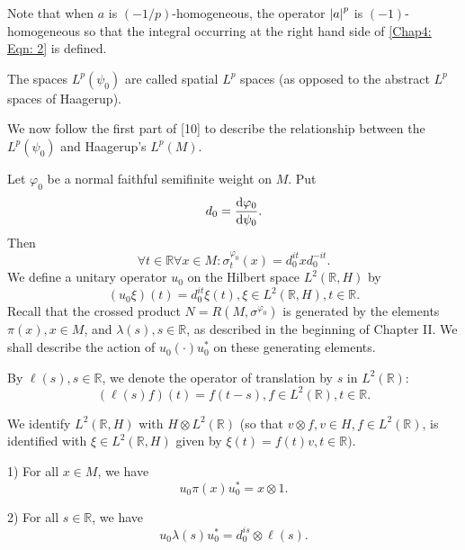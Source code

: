 Note that when $a$ is $(-1/p)$-homogeneous, the operator $\abs{a}^p$ is $(-1)$-homogeneous so that the integral occurring at the right hand side of \eqref{Chap4: Eqn: 2} is defined.\par
The spaces $L^p(\psi_0)$ are called spatial $L^p$ spaces (as opposed to the abstract $L^p$ spaces of Haagerup).\par
We now follow the first part of [10] to describe the relationship between the $L^p(\psi_0)$ and Haagerup's $L^p(M)$.\par
Let $\varphi_0$ be a normal faithful semifinite weight on $M$. Put
\begin{equation}
    d_0=\dv{\varphi_0}{\psi_0}.
\end{equation}
Then
\begin{equation}
    \forall t\in \mathbb{R}\forall x\in M:\sigma_t^{\varphi_0}(x)=d_0^{it}xd_0^{-it}.
\end{equation}
We define a unitary operator $u_0$ on the Hilbert space $L^2(\mathbb{R},H)$ by
\begin{equation}
    (u_0\xi)(t)=d_0^{it}\xi(t),\xi\in L^2(\mathbb{R},H),t\in \mathbb{R}.
\end{equation}
Recall that the crossed product $N=R(M,\sigma^{\varphi_0})$ is generated by the elements $\pi(x),x\in M$, and $\lambda(s),s\in \mathbb{R}$, as described in the beginning of Chapter II. We shall describe the action of $u_0(\cdot)u_0^*$ on these generating elements.\par
By $\ell(s), s\in \mathbb{R}$, we denote the operator of translation by $s$ in $L^2(\mathbb{R})$:
\[
    (\ell(s)f)(t)=f(t-s),f\in L^2(\mathbb{R}),t\in \mathbb{R}.
\]\par
We identify $L^2(\mathbb{R},H)$ with $H\otimes L^2(\mathbb{R})$ (so that $v\otimes f,v\in H,f\in L^2(\mathbb{R})$, is identified with $\xi\in L^2(\mathbb{R},H)$ given by $\xi(t)=f(t)v,t\in \mathbb{R})$.
\begin{proposition}\label{Chap4: Prop: 3}
    1) For all $x\in M$, we have
    \[
        u_0\pi(x)u_0^*=x\otimes 1.
    \]

    2) For all $s\in \mathbb{R}$, we have
    \[
        u_0\lambda(s)u_0^*=d_0^{is}\otimes \ell(s).
    \]
\end{proposition}
